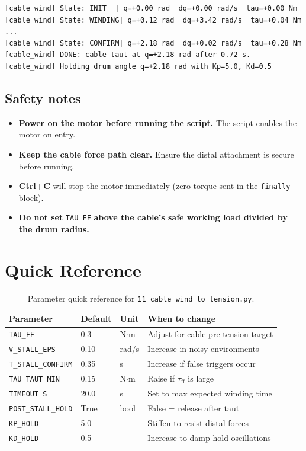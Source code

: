\documentclass[11pt,a4paper]{article}
\begin{document}
\begin{lstlisting}[language={}]
[cable_wind] State: INIT  | q=+0.00 rad  dq=+0.00 rad/s  tau=+0.00 Nm
[cable_wind] State: WINDING| q=+0.12 rad  dq=+3.42 rad/s  tau=+0.04 Nm
...
[cable_wind] State: CONFIRM| q=+2.18 rad  dq=+0.02 rad/s  tau=+0.28 Nm
[cable_wind] DONE: cable taut at q=+2.18 rad after 0.72 s.
[cable_wind] Holding drum angle q=+2.18 rad with Kp=5.0, Kd=0.5
\end{lstlisting}

\subsection{Safety notes}

\begin{itemize}
  \item \textbf{Power on the motor before running the script.}
        The script enables the motor on entry.
  \item \textbf{Keep the cable force path clear.}  Ensure the distal
        attachment is secure before running.
  \item \textbf{Ctrl+C} will stop the motor immediately (zero torque sent
        in the \texttt{finally} block).
  \item \textbf{Do not set} \texttt{TAU\_FF} \textbf{above the cable's safe
        working load divided by the drum radius.}
\end{itemize}

\section{Quick Reference}
\label{sec:quickref}

\begin{table}[ht]
\centering
\caption{Parameter quick reference for \texttt{11\_cable\_wind\_to\_tension.py}.}
\begin{tabular}{llll}
\toprule
Parameter & Default & Unit & When to change \\
\midrule
\texttt{TAU\_FF} & 0.3 & N$\cdot$m & Adjust for cable pre-tension target \\
\texttt{V\_STALL\_EPS} & 0.10 & rad/s & Increase in noisy environments \\
\texttt{T\_STALL\_CONFIRM} & 0.35 & s & Increase if false triggers occur \\
\texttt{TAU\_TAUT\_MIN} & 0.15 & N$\cdot$m & Raise if $\tau_\text{ff}$ is large \\
\texttt{TIMEOUT\_S} & 20.0 & s & Set to max expected winding time \\
\texttt{POST\_STALL\_HOLD} & True & bool & False = release after taut \\
\texttt{KP\_HOLD} & 5.0 & -- & Stiffen to resist distal forces \\
\texttt{KD\_HOLD} & 0.5 & -- & Increase to damp hold oscillations \\
\bottomrule
\end{tabular}
\end{table}
\end{document}
